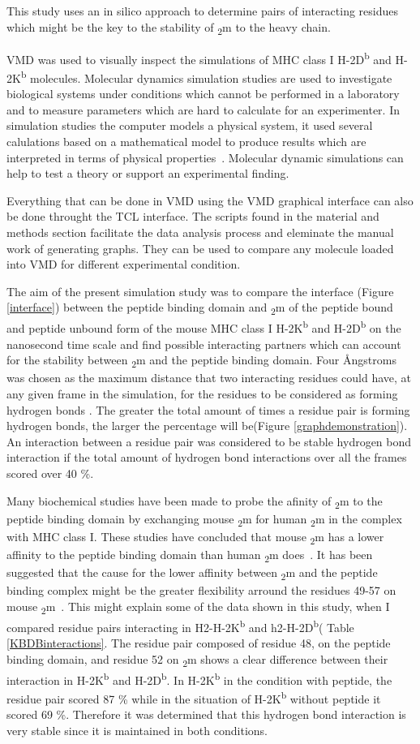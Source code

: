 \documentclass[11pt,twocolumn]{article}
\newcommand{\db}{H-2D\textsuperscript{b}\xspace}
\newcommand{\kb}{H-2K\textsuperscript{b}\xspace}
\newcommand{\angstr}{{\AA}ngstroms\xspace}
\newcommand{\btm}{\textbeta\textsubscript{2}m\xspace}
\begin{document}
This study uses an in silico approach to determine pairs of interacting
residues which might be the key to the stability of \btm to the heavy chain. 


VMD was used to visually inspect the simulations of MHC class I \db and \kb
molecules. Molecular dynamics simulation studies are  used to investigate
biological systems under conditions which cannot be performed in a laboratory
and to  measure parameters which are hard to calculate for an experimenter. In
simulation studies the computer models a physical system, it used several
calulations based on a mathematical model to produce results which are
interpreted in terms of physical properties~\cite{allen2004introduction}.
Molecular dynamic simulations can help to test a theory or support an
experimental finding.   

  
Everything that can be done in VMD using the VMD graphical interface can also
be done throught the TCL interface. The scripts found in the material and
methods section facilitate the data analysis process and eleminate the manual
work of generating graphs. They can be used to compare any molecule loaded into
VMD for different experimental condition.




The aim of the present simulation study was to compare the interface (Figure
\ref{interface}) between the peptide binding domain and \btm of the peptide
bound and peptide unbound form of the mouse MHC class I \kb and \db on the
nanosecond time scale and find possible interacting partners which can account
for the stability between \btm and the peptide binding domain. Four \angstr was
chosen as the maximum distance that two interacting residues could have, at any
given frame in the simulation, for the residues to be considered as forming
hydrogen bonds \cite{McDonald1994777}. The greater the total amount of times a
residue pair is forming hydrogen bonds, the larger the percentage will
be(Figure \ref{graphdemonstration}). An interaction  between a residue pair was
considered to be stable hydrogen bond interaction if the total amount of
hydrogen bond interactions over all the frames scored over 40 \%. 

Many biochemical studies have been made to probe the afinity of \btm to the
peptide binding domain by exchanging mouse \btm for human \btm in the complex
with MHC class I. These studies have concluded that mouse \btm has a lower
affinity to the peptide binding domain than human \btm
does~\cite{Shields1999561}. It has been suggested that the cause for the lower
affinity between \btm and the peptide binding complex might be the greater
flexibility arround the residues 49-57 on mouse \btm~\cite{Shields1999561}.
This might explain some of the data shown in this study, when I compared
residue pairs interacting in H2-\kb and h2-\db ( Table \ref{KBDBinteractions}.
The residue pair composed of residue 48, on the peptide binding domain, and
residue 52 on \btm shows a clear difference between their interaction in \kb
and \db. In \kb in the condition with peptide, the residue pair scored 87 \%
while in the situation of \kb without peptide it scored 69 \%. Therefore it was
determined that this hydrogen bond interaction is very stable since it is
maintained in both conditions.
\end{document}
